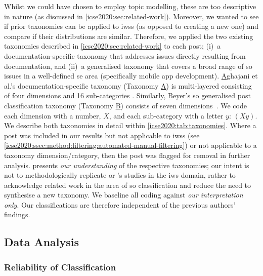 Whilst we could have chosen to employ topic modelling, these are too descriptive in nature (as discussed in \cref{icse2020:sec:related-work}). Moreover, we wanted to see if prior taxonomies can be applied to \glspl{iws} (as opposed to creating a new one) and compare if their distributions are similar.
Therefore, we applied the two existing taxonomies described in \cref{icse2020:sec:related-work} to each post; (i)~a documentation-specific taxonomy that addresses issues directly resulting from documentation, and (ii)~a generalised taxonomy that covers a broad range of \gls{so} issues in a well-defined \gls{se} area (specifically mobile app development).
\uline{A}ghajani et al.'s documentation-specific taxonomy (Taxonomy \uline{A}) is multi-layered consisting of four dimensions and 16 sub-categories \citep{Aghajani:2019bo}. Similarly, \uline{B}eyer's \gls{so} generalised post classification taxonomy (Taxonomy \uline{B}) consists of seven dimensions~\citep{Beyer:2018fm}. We code each dimension with a number, $X$, and each sub-category with a letter $y$: $(Xy)$. We describe both taxonomies in detail within \cref{icse2020:tab:taxonomies}. Where a post was included in our results but not applicable to \glspl{iws} (see \cref{icse2020:ssec:method:filtering:automated-manual-filtering}) or not applicable to a taxonomy dimension/category, then the post was flagged for removal in further analysis.
 presents \textit{our understanding} of the respective taxonomies; our intent is not to methodologically replicate \citeauthor{Aghajani:2019bo} or \citeauthor{Beyer:2018fm}'s studies in the \gls{iws} domain, rather to acknowledge related work in the area of \gls{so} classification and reduce the need to synthesise a new taxonomy. We baseline all coding against \textit{our interpretation only}. Our classifications are therefore independent of the previous authors' findings.


\afterpage{\begin{landscape}

\end{landscape}}

\subsection{Data Analysis}

\subsubsection{Reliability of Classification}
\label{icse2020:ssec:method:filtering:reliability}

